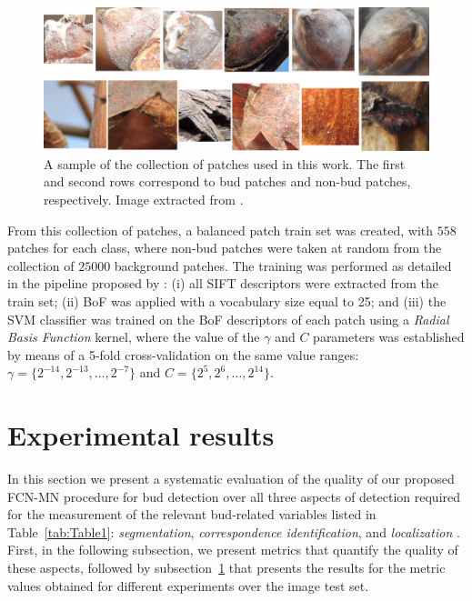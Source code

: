 \documentclass[a4paper,authoryear,review]{elsarticle}
\begin{document}
	
	\begin{figure}
		\centering
		\includegraphics[width=12cm]{figures/Figure2.png}
		\caption{
			A sample of the collection of patches used in this work. The first and second rows correspond to bud patches and non-bud patches, respectively. Image extracted from \citet{perez2017image}.
		}
		\label{fig:Figure2}
	\end{figure}
	
	
	From this collection of patches, a balanced patch train set was created, with $558$ patches for each class, where non-bud patches were taken at random from the collection of $25000$ background patches. The training was performed as detailed in the pipeline proposed by \citet{perez2017image}: (i) all SIFT descriptors were extracted from the train set; (ii) BoF was applied with a vocabulary size equal to 25; and (iii) the SVM classifier was trained on the BoF descriptors of each patch using a \emph{Radial Basis Function} kernel, where the value of the $\gamma$ and $C$ parameters was established by means of a 5-fold cross-validation on the same value ranges: $\gamma = \{2^{-14}, 2^{-13}, \ldots, 2^{-7}\}$ and $C = \{2^{5}, 2^{6},\ldots , 2^{14}\}$.
	
	\section{Experimental results} 
	\label{sec:results}
	
	In this section we present a systematic evaluation of the quality of our proposed FCN-MN procedure for bud detection over all three aspects of detection required for the measurement of the relevant bud-related variables listed in Table~\ref{tab:Table1}: \emph{segmentation}, \emph{correspondence identification}, and \emph{localization} . 
	First, in the following subsection, we present metrics that quantify the quality of these aspects, followed by subsection~\ref{sec:results} that presents the results for the metric values obtained for different experiments over the image test set. 
	
\end{document}

